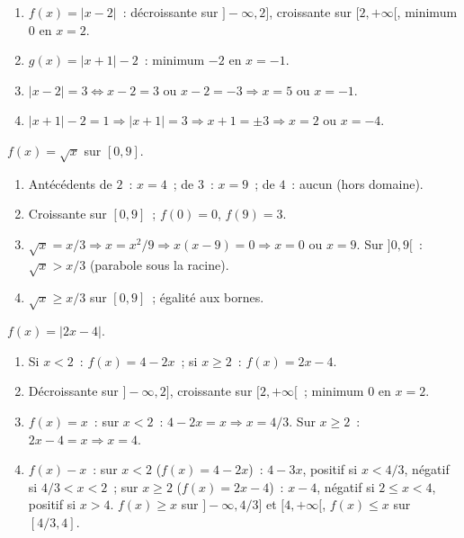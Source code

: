 \begin{enumerate}
  \item $f(x)=|x-2|$~: d\'ecroissante sur $]-\infty,2]$, croissante sur $[2,+\infty[$, minimum $0$ en $x=2$.
  \item $g(x)=|x+1|-2$~: minimum $-2$ en $x=-1$.
  \item $|x-2|=3\Leftrightarrow x-2=3$ ou $x-2=-3\Rightarrow x=5$ ou $x=-1$.
  \item $|x+1|-2=1\Rightarrow|x+1|=3\Rightarrow x+1=\pm3\Rightarrow x=2$ ou $x=-4$.
\end{enumerate}


$f(x)=\sqrt{x}$ sur $[0,9]$.
\begin{enumerate}
  \item Ant\'ec\'edents de $2$~: $x=4$~; de $3$~: $x=9$~; de $4$~: aucun (hors domaine).
  \item Croissante sur $[0,9]$~; $f(0)=0$, $f(9)=3$.
  \item $\sqrt{x}=x/3\Rightarrow x=x^2/9\Rightarrow x(x-9)=0\Rightarrow x=0$ ou $x=9$.
        Sur $]0,9[$~: $\sqrt{x}>x/3$ (parabole sous la racine).
  \item $\sqrt{x}\geq x/3$ sur $[0,9]$~; \'egalit\'e aux bornes.
\end{enumerate}


$f(x)=|2x-4|$.
\begin{enumerate}
  \item Si $x<2$~: $f(x)=4-2x$~; si $x\geq2$~: $f(x)=2x-4$.
  \item D\'ecroissante sur $]-\infty,2]$, croissante sur $[2,+\infty[$~; minimum $0$ en $x=2$.
  \item $f(x)=x$~: sur $x<2$~: $4-2x=x\Rightarrow x=4/3$.\checkmark\quad
        Sur $x\geq2$~: $2x-4=x\Rightarrow x=4$.\checkmark
  \item $f(x)-x$~: sur $x<2$ ($f(x)=4-2x$)~: $4-3x$, positif si $x<4/3$, n\'egatif si $4/3<x<2$~;
        sur $x\geq2$ ($f(x)=2x-4$)~: $x-4$, n\'egatif si $2\leq x<4$, positif si $x>4$.
        $f(x)\geq x$ sur $]-\infty,4/3]$ et $[4,+\infty[$, $f(x)\leq x$ sur $[4/3,4]$.
\end{enumerate}



